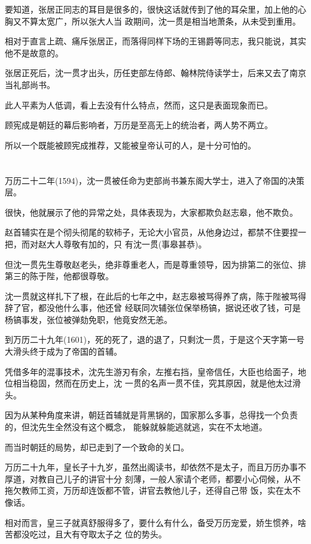 \documentclass[11pt,a4paper,onecolumn]{article}
\begin{document}
要知道，张居正同志的耳目是很多的，很快这话就传到了他的耳朵里，加上他的心胸又不算太宽广，所以张大人当
政期间，沈一贯是相当地萧条，从未受到重用。

相对于直言上疏、痛斥张居正，而落得同样下场的王锡爵等同志，我只能说，其实他不是故意的。

张居正死后，沈一贯才出头，历任吏部左侍郎、翰林院侍读学士，后来又去了南京当礼部尚书。

此人平素为人低调，看上去没有什么特点，然而，这只是表面现象而已。

顾宪成是朝廷的幕后影响者，万历是至高无上的统治者，两人势不两立。

所以一个既能被顾宪成推荐，又能被皇帝认可的人，是十分可怕的。

\section[\thesection]{}

万历二十二年(1594)，沈一贯被任命为吏部尚书兼东阁大学士，进入了帝国的决策层。

很快，他就展示了他的异常之处，具体表现为，大家都欺负赵志皋，他不欺负。

赵首辅实在是个彻头彻尾的软柿子，无论大小官员，从他身边过，都禁不住要捏一把，而对赵大人尊敬有加的，只
有沈一贯(事皋甚恭)。

但沈一贯先生尊敬赵老头，绝非尊重老人，而是尊重领导，因为排第二的张位、排第三的陈于陛，他都很尊敬。

沈一贯就这样扎下了根，在此后的七年之中，赵志皋被骂得养了病，陈于陛被骂得辞了官，都没他什么事，他还曾
经联同次辅张位保举杨镐，据说还收了钱，可是杨镐事发，张位被弹劾免职，他竟安然无恙。

到万历二十九年(1601)，死的死了，退的退了，只剩沈一贯，于是这个天字第一号大滑头终于成为了帝国的首辅。

凭借多年的混事技术，沈先生游刃有余，左推右挡，皇帝信任，大臣也给面子，地位相当稳固，然而在历史上，沈
一贯的名声一贯不佳，究其原因，就是他太过滑头。

因为从某种角度来讲，朝廷首辅就是背黑锅的，国家那么多事，总得找一个负责的，但沈先生全然没有这个概念，
能躲就躲能逃就逃，实在不太地道。

而当时朝廷的局势，却已走到了一个致命的关口。

万历二十九年，皇长子十九岁，虽然出阁读书，却依然不是太子，而且万历办事不厚道，对教自己儿子的讲官十分
刻薄，一般人家请个老师，都要小心伺候，从不拖欠教师工资，万历却连饭都不管，讲官去教他儿子，还得自己带
饭，实在太不像话。

相对而言，皇三子就真舒服得多了，要什么有什么，备受万历宠爱，娇生惯养，啥苦都没吃过，且大有夺取太子之
位的势头。
\end{document}
